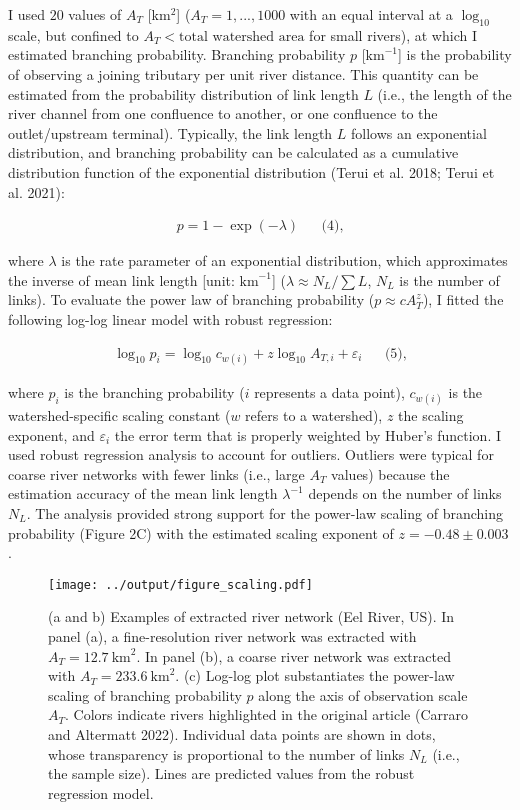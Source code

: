 \documentclass[
  12pt,
]{article}
\begin{document}
I used \(20\) values of \(A_T\) {[}km\(^2\){]} (\(A_T=1,...,1000\) with an equal interval at a \(\log_{10}\) scale, but confined to \(A_T < \text{total watershed area}\) for small rivers), at which I estimated branching probability. Branching probability \(p\) {[}\(\text{km}^{-1}\){]} is the probability of observing a joining tributary per unit river distance. This quantity can be estimated from the probability distribution of link length \(L\) (i.e., the length of the river channel from one confluence to another, or one confluence to the outlet/upstream terminal). Typically, the link length \(L\) follows an exponential distribution, and branching probability can be calculated as a cumulative distribution function of the exponential distribution (Terui et al. 2018; Terui et al. 2021):

\[
\begin{aligned}
p = 1 - \exp(-\lambda)  &&\text{(4),}
\end{aligned}
\]

where \(\lambda\) is the rate parameter of an exponential distribution, which approximates the inverse of mean link length {[}unit: \(\text{km}^{-1}\){]} (\(\lambda \approx N_L / \sum L\), \(N_L\) is the number of links). To evaluate the power law of branching probability (\(p \approx cA_T^z\)), I fitted the following log-log linear model with robust regression:

\[
\begin{aligned}
\log_{10} p_{i} = \log_{10} c_{w(i)} + z\log_{10} A_{T,i} + \varepsilon_{i}  &&\text{(5),}
\end{aligned}
\]

where \(p_i\) is the branching probability (\(i\) represents a data point), \(c_{w(i)}\) is the watershed-specific scaling constant (\(w\) refers to a watershed), \(z\) the scaling exponent, and \(\varepsilon_i\) the error term that is properly weighted by Huber's function. I used robust regression analysis to account for outliers. Outliers were typical for coarse river networks with fewer links (i.e., large \(A_T\) values) because the estimation accuracy of the mean link length \(\lambda^{-1}\) depends on the number of links \(N_L\). The analysis provided strong support for the power-law scaling of branching probability (Figure 2C) with the estimated scaling exponent of \(z = -0.48 \pm 0.003\).

\begin{figure}
\centering
\texttt{[image: ../output/figure\_scaling.pdf]}
\caption{\label{fig:fig-pr}(a and b) Examples of extracted river network (Eel River, US). In panel (a), a fine-resolution river network was extracted with \(A_T = 12.7~\text{km}^2\). In panel (b), a coarse river network was extracted with \(A_T = 233.6~\text{km}^2\). (c) Log-log plot substantiates the power-law scaling of branching probability \(p\) along the axis of observation scale \(A_T\). Colors indicate rivers highlighted in the original article (Carraro and Altermatt 2022). Individual data points are shown in dots, whose transparency is proportional to the number of links \(N_L\) (i.e., the sample size). Lines are predicted values from the robust regression model.}
\end{figure}
\end{document}
